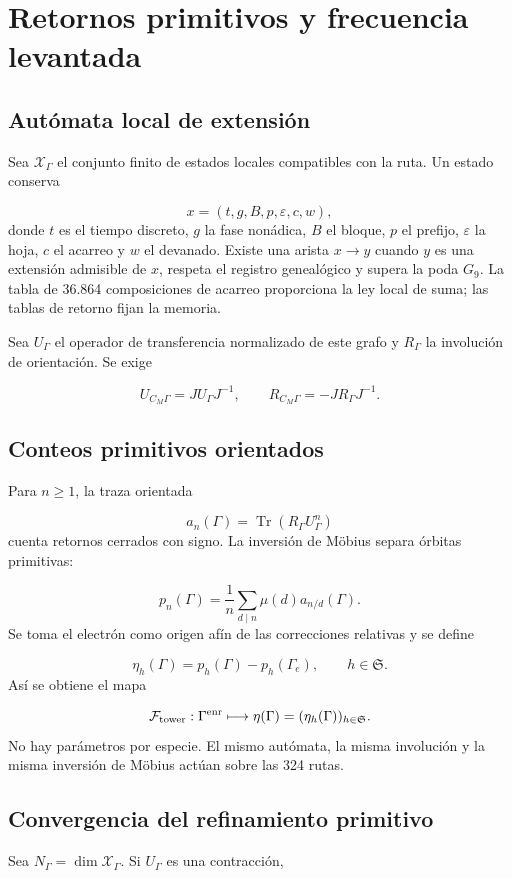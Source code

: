 \section{Retornos primitivos y frecuencia levantada}
\subsection{Autómata local de extensión}
Sea \(\mathscr X_\Gamma\) el conjunto finito de estados locales compatibles con la ruta. Un estado conserva

\[
 x=(t,g,B,p,\varepsilon,c,w),
\]
donde \(t\) es el tiempo discreto, \(g\) la fase nonádica, \(B\) el bloque, \(p\) el prefijo, \(\varepsilon\) la hoja, \(c\) el acarreo y \(w\) el devanado. Existe una arista \(x\to y\) cuando \(y\) es una extensión admisible de \(x\), respeta el registro genealógico y supera la poda \(G_9\). La tabla de 36.864 composiciones de acarreo proporciona la ley local de suma; las tablas de retorno fijan la memoria.

Sea \(U_\Gamma\) el operador de transferencia normalizado de este grafo y \(R_\Gamma\) la involución de orientación. Se exige

\[
 U_{C_M\Gamma}=J U_\Gamma J^{-1},\qquad
 R_{C_M\Gamma}=-J R_\Gamma J^{-1}.
\]
\subsection{Conteos primitivos orientados}
Para \(n\ge1\), la traza orientada

\[
 a_n(\Gamma)=\operatorname{Tr}(R_\Gamma U_\Gamma^n)
\]
cuenta retornos cerrados con signo. La inversión de Möbius separa órbitas primitivas:

\[
 p_n(\Gamma)
 =\frac1n\sum_{d\mid n}\mu(d)a_{n/d}(\Gamma).
\]
Se toma el electrón como origen afín de las correcciones relativas y se define

\[
 \boxed{
 \eta_h(\Gamma)=p_h(\Gamma)-p_h(\Gamma_e),
 \qquad h\in\mathfrak S.}
\]
Así se obtiene el mapa

\[
 \mathcal F_{\rm tower}:
 \Gamma^{\rm enr}\longmapsto
 \eta(\Gamma)=(\eta_h(\Gamma))_{h\in\mathfrak S}.
\]
No hay parámetros por especie. El mismo autómata, la misma involución y la misma inversión de Möbius actúan sobre las 324 rutas.

\subsection{Convergencia del refinamiento primitivo}
Sea \(N_\Gamma=\dim\mathscr X_\Gamma\). Si \(U_\Gamma\) es una contracción,

